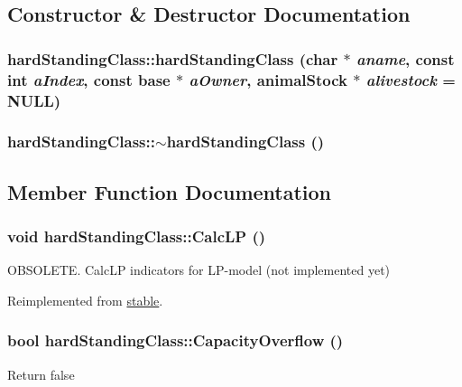 \subsection{Constructor \& Destructor Documentation}
\hypertarget{classhard_standing_class_a9bd9a22eddef5eaa90c3035c65fe1dd2}{
\subsubsection[{hardStandingClass}]{\setlength{\rightskip}{0pt plus 5cm}hardStandingClass::hardStandingClass (char $\ast$ {\em aname}, \/  const int {\em aIndex}, \/  const {\bf base} $\ast$ {\em aOwner}, \/  {\bf animalStock} $\ast$ {\em alivestock} = {\ttfamily NULL})}}
\label{classhard_standing_class_a9bd9a22eddef5eaa90c3035c65fe1dd2}
\hypertarget{classhard_standing_class_af7253b376b9969d983126583cec5504b}{
\subsubsection[{$\sim$hardStandingClass}]{\setlength{\rightskip}{0pt plus 5cm}hardStandingClass::$\sim$hardStandingClass ()}}
\label{classhard_standing_class_af7253b376b9969d983126583cec5504b}


\subsection{Member Function Documentation}
\hypertarget{classhard_standing_class_a03f3703e524d927cbf930e47bebd846d}{
\subsubsection[{CalcLP}]{\setlength{\rightskip}{0pt plus 5cm}void hardStandingClass::CalcLP ()}}
\label{classhard_standing_class_a03f3703e524d927cbf930e47bebd846d}


OBSOLETE. CalcLP indicators for LP-\/model (not implemented yet) 

Reimplemented from \hyperlink{classstable_acaf566bef659f0a671e27afa6244df4b}{stable}.\hypertarget{classhard_standing_class_a458d101f2c4346d2e019d284f273181b}{
\subsubsection[{CapacityOverflow}]{\setlength{\rightskip}{0pt plus 5cm}bool hardStandingClass::CapacityOverflow ()}}
\label{classhard_standing_class_a458d101f2c4346d2e019d284f273181b}
Return false 

